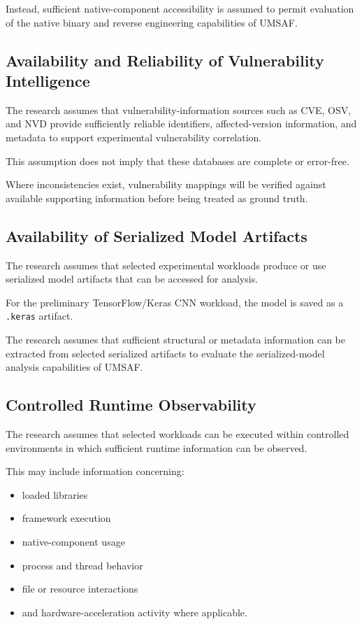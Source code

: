 \documentclass[
  12pt,
  letterpaper,
  oneside]{report}
\providecommand{\tightlist}{%
  \setlength{\itemsep}{0pt}\setlength{\parskip}{0pt}}
\begin{document}
Instead, sufficient native-component accessibility is assumed to permit
evaluation of the native binary and reverse engineering capabilities of
UMSAF.

\subsection{Availability and Reliability of Vulnerability Intelligence}\label{1324-availability-and-reliability-of-vulnerability-intelligence}

The research assumes that vulnerability-information sources such as CVE,
OSV, and NVD provide sufficiently reliable identifiers, affected-version
information, and metadata to support experimental vulnerability
correlation.

This assumption does not imply that these databases are complete or
error-free.

Where inconsistencies exist, vulnerability mappings will be verified
against available supporting information before being treated as ground
truth.

\subsection{Availability of Serialized Model Artifacts}\label{1325-availability-of-serialized-model-artifacts}

The research assumes that selected experimental workloads produce or use
serialized model artifacts that can be accessed for analysis.

For the preliminary TensorFlow/Keras CNN workload, the model is saved as
a \texttt{.keras} artifact.

The research assumes that sufficient structural or metadata information
can be extracted from selected serialized artifacts to evaluate the
serialized-model analysis capabilities of UMSAF.

\subsection{Controlled Runtime Observability}\label{1326-controlled-runtime-observability}

The research assumes that selected workloads can be executed within
controlled environments in which sufficient runtime information can be
observed.

This may include information concerning:

\begin{itemize}
\tightlist
\item
  loaded libraries
\item
  framework execution
\item
  native-component usage
\item
  process and thread behavior
\item
  file or resource interactions
\item
  and hardware-acceleration activity where applicable.
\end{itemize}
\end{document}
